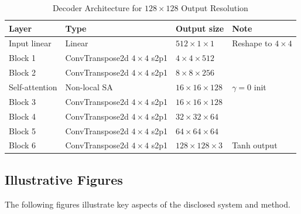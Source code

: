 \documentclass[12pt,letterpaper]{article}
\begin{document}
\begin{table}[H]
\centering
\caption{Decoder Architecture for $128 \times 128$ Output Resolution}
\label{tab:arch}
\begin{tabular}{llll}
\toprule
\textbf{Layer} & \textbf{Type} & \textbf{Output size} & \textbf{Note} \\
\midrule
Input linear   & Linear        & $512 \times 1 \times 1$  & Reshape to $4 \times 4$ \\
Block 1        & ConvTranspose2d $4\times4$ s2p1 & $4 \times 4 \times 512$ & \\
Block 2        & ConvTranspose2d $4\times4$ s2p1 & $8 \times 8 \times 256$ & \\
Self-attention & Non-local SA                & $16 \times 16 \times 128$ & $\gamma=0$ init \\
Block 3        & ConvTranspose2d $4\times4$ s2p1 & $16 \times 16 \times 128$ & \\
Block 4        & ConvTranspose2d $4\times4$ s2p1 & $32 \times 32 \times 64$ & \\
Block 5        & ConvTranspose2d $4\times4$ s2p1 & $64 \times 64 \times 64$ & \\
Block 6        & ConvTranspose2d $4\times4$ s2p1 & $128 \times 128 \times 3$ & Tanh output \\
\bottomrule
\end{tabular}
\end{table}

\subsection{Illustrative Figures}

The following figures illustrate key aspects of the disclosed system and method.
\end{document}
